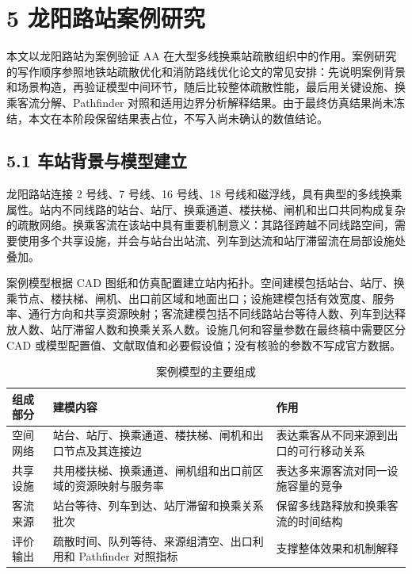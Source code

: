 \documentclass[UTF8,a4paper,12pt]{ctexart}
\begin{document}
\section{5 龙阳路站案例研究}

本文以龙阳路站为案例验证 AA 在大型多线换乘站疏散组织中的作用。案例研究的写作顺序参照地铁站疏散优化和消防路线优化论文的常见安排：先说明案例背景和场景构造，再验证模型中间环节，随后比较整体疏散性能，最后用关键设施、换乘客流分解、Pathfinder 对照和适用边界分析解释结果。由于最终仿真结果尚未冻结，本文在本阶段保留结果表占位，不写入尚未确认的数值结论。

\subsection{5.1 车站背景与模型建立}

龙阳路站连接 2 号线、7 号线、16 号线、18 号线和磁浮线，具有典型的多线换乘属性。站内不同线路的站台、站厅、换乘通道、楼扶梯、闸机和出口共同构成复杂的疏散网络。换乘客流在该站中具有重要机制意义：其路径跨越不同线路空间，需要使用多个共享设施，并会与站台出站流、列车到达流和站厅滞留流在局部设施处叠加。

案例模型根据 CAD 图纸和仿真配置建立站内拓扑。空间建模包括站台、站厅、换乘节点、楼扶梯、闸机、出口前区域和地面出口；设施建模包括有效宽度、服务率、通行方向和共享资源映射；客流建模包括不同线路站台等待人数、列车到达释放人数、站厅滞留人数和换乘关系人数。设施几何和容量参数在最终稿中需要区分 CAD 或模型配置值、文献取值和必要假设值；没有核验的参数不写成官方数据。

\begin{table}[htbp]
\centering
\caption{案例模型的主要组成}
\small
\begin{tabular}{p{}p{}p{}}
\toprule
组成部分 & 建模内容 & 作用 \\
\midrule
空间网络 & 站台、站厅、换乘通道、楼扶梯、闸机和出口节点及其连接边 & 表达乘客从不同来源到出口的可行移动关系 \\
共享设施 & 共用楼扶梯、换乘通道、闸机组和出口前区域的资源映射与服务率 & 表达多来源客流对同一设施容量的竞争 \\
客流来源 & 站台等待、列车到达、站厅滞留和换乘关系批次 & 保留多线路释放和换乘客流的时间结构 \\
评价输出 & 疏散时间、队列等待、来源组清空、出口利用和 Pathfinder 对照指标 & 支撑整体效果和机制解释 \\
\bottomrule
\end{tabular}
\end{table}
\end{document}
